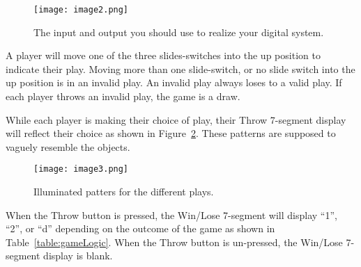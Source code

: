 \begin{figure}[ht]
    \texttt{[image:  image2.png]}
    \caption{The input and output you should use to realize your digital system.}
    \label{figure:systemIO}
\end{figure}

A player will move one of the three slides-switches into the up position
to indicate their play. Moving more than one slide-switch, or no slide
switch into the up position is in an invalid play. An invalid play
always loses to a valid play. If each player throws an invalid play, the
game is a draw.

While each player is making their choice of play, their Throw 7-segment
display will reflect their choice as shown in Figure~\ref{figure:play7seg}. These patterns
are supposed to vaguely resemble the objects.

\begin{figure}[ht]
    \texttt{[image: image3.png]}
    \caption{Illuminated patters for the different plays.}
    \label{figure:play7seg}
\end{figure}

When the Throw button is pressed, the Win/Lose 7-segment will display
``1'', ``2'', or ``d'' depending on the outcome of the game as shown in
Table~\ref{table:gameLogic}. When the Throw button is un-pressed, the Win/Lose 7-segment
display is blank.

